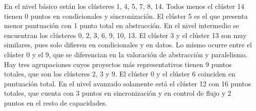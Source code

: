 \documentclass[a4paper, 12pt]{book}
\begin{document}
\begin{table}[H]
    \centering
    \caption{Puntuaciones de los proyectos representativos para el clustering con k=15}
    \label{table:representative_k15}
\end{table}

En el nivel básico están los clústeres 1, 4, 5, 7, 8, 14. Todos menos el clúster 14 tienen 0 puntos en condicionales y sincronización. El clúster 5 es el que presenta menor puntuación con 1 punto total en abstracción.
En el nivel intermedio se encuentran los clústeres 0, 2, 3, 6, 9, 10, 13. El clúster 3 y el clúster 13 son muy similares, pues solo difieren en condicionales y en datos. Lo mismo ocurre entre el clúster 0 y el 9, que se diferencian en la valoración de abstracción y paralelismo. Hay tres agrupaciones cuyos proyectos más representativos tienen 9 puntos totales, que son los clústeres 2, 3 y 9. El clúster 0 y el clúster 6 coinciden en puntuación total. En el nivel avanzado solamente está el clúster 12 con 16 puntos totales, que cuenta con 3 puntos en sincronización y en control de flujo y 2 puntos en el resto de capacidades.
\end{document}
